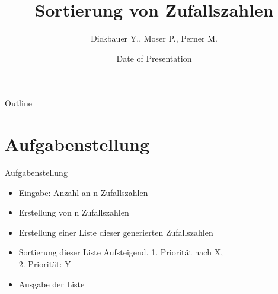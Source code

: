 

\title[BSP03 - Sortierung ZZ]{Sortierung von Zufallszahlen}
\author{Dickbauer Y., Moser P., Perner M.}
\date{Date of Presentation}



\begin{frame}
  \titlepage
\end{frame}

\begin{frame}{Outline}
  \tableofcontents
\end{frame}

\section{Aufgabenstellung}
\begin{frame}{Aufgabenstellung}

\begin{itemize}
  \item Eingabe: Anzahl an n Zufallszahlen
  \item Erstellung von n Zufallszahlen
  \item Erstellung einer Liste dieser generierten Zufallszahlen
  \item Sortierung dieser Liste Aufsteigend. 1. Priorität nach X, \\2. Priorität: Y
  \item Ausgabe der Liste
\end{itemize}

\end{frame}

